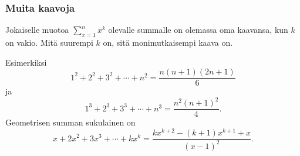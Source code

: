 \subsubsection{Muita kaavoja}

Jokaiselle muotoa $\sum_{x=1}^n x^k$ olevalle summalle
on olemassa oma kaavansa, kun $k$ on vakio.
Mitä suurempi $k$ on, sitä monimutkaisempi kaava on.

Esimerkiksi
\[1^2+2^2+3^2+\cdots+n^2 = \frac{n(n+1)(2n+1)}{6}\]
ja
\[1^3+2^3+3^3+\cdots+n^3 = \frac{n^2(n+1)^2}{4}.\]
Geometrisen summan sukulainen on
\[x+2x^2+3x^3+\cdots+k x^k = \frac{kx^{k+2}-(k+1)x^{k+1}+x}{(x-1)^2}. \]